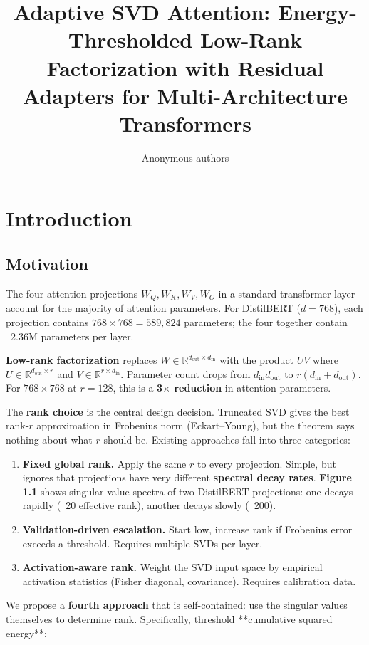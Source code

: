 \title{\textbf{Adaptive SVD Attention: Energy-Thresholded Low-Rank Factorization with Residual Adapters for Multi-Architecture Transformers}}

\author{Anonymous authors}



\section{Introduction}

\subsection{Motivation}

The four attention projections $W_Q, W_K, W_V, W_O$ in a standard transformer 
layer account for the majority of attention parameters. For DistilBERT 
($d = 768$), each projection contains $768 \times 768 = 589{,}824$ parameters; 
the four together contain ~2.36M parameters per layer.

\textbf{Low-rank factorization} replaces $W \in \mathbb{R}^{d_\text{out} \times d_\text{in}}$ 
with the product $U V$ where $U \in \mathbb{R}^{d_\text{out} \times r}$ and 
$V \in \mathbb{R}^{r \times d_\text{in}}$. Parameter count drops from 
$d_\text{in} d_\text{out}$ to $r (d_\text{in} + d_\text{out})$. For 
$768 \times 768$ at $r = 128$, this is a \textbf{3$\times$ reduction} in attention 
parameters.

The \textbf{rank choice} is the central design decision. Truncated SVD gives the 
best rank-$r$ approximation in Frobenius norm (Eckart--Young), but the theorem 
says nothing about what $r$ should be. Existing approaches fall into three 
categories:

\begin{enumerate}
\item \textbf{Fixed global rank.} Apply the same $r$ to every projection. Simple, but
  ignores that projections have very different \textbf{spectral decay rates}.
  \textbf{Figure 1.1} shows singular value spectra of two DistilBERT projections:
  one decays rapidly (~20 effective rank), another decays slowly (~200).

\item \textbf{Validation-driven escalation.} Start low, increase rank if Frobenius
  error exceeds a threshold. Requires multiple SVDs per layer.

\item \textbf{Activation-aware rank.} Weight the SVD input space by empirical
  activation statistics (Fisher diagonal, covariance). Requires calibration
  data.

\end{enumerate}
We propose a \textbf{fourth approach} that is self-contained: use the singular 
values themselves to determine rank. Specifically, threshold **cumulative 
squared energy**:

